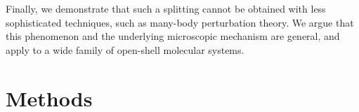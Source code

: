 \documentclass[aps,prx,twocolumn,superscriptaddress]{revtex4-2}
\begin{document}


Finally, we demonstrate that such a splitting cannot be obtained with less sophisticated techniques, 
such as many-body perturbation theory. 
We argue that this phenomenon and the underlying microscopic mechanism are general, 
and apply to a wide family of open-shell molecular systems. 



\section{Methods}\label{sec:methods}
\end{document}

